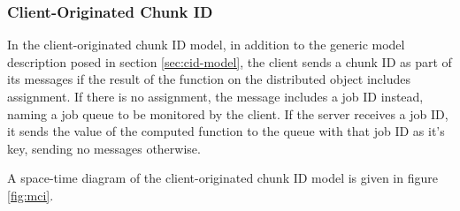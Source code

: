 \subsubsection{Client-Originated Chunk ID}

In the client-originated chunk ID  model, in addition to the generic model
description posed in section \ref{sec:cid-model}, the client sends a chunk ID
as part of its messages if the result of the function on the distributed object
includes assignment.
If there is no assignment, the message includes a job ID instead, naming a job
queue to be monitored by the client.
If the server receives a job ID, it sends the value of the computed function to
the queue with that job ID as it's key, sending no messages otherwise.

A space-time diagram of the client-originated chunk ID model is given in figure
\ref{fig:mci}.

